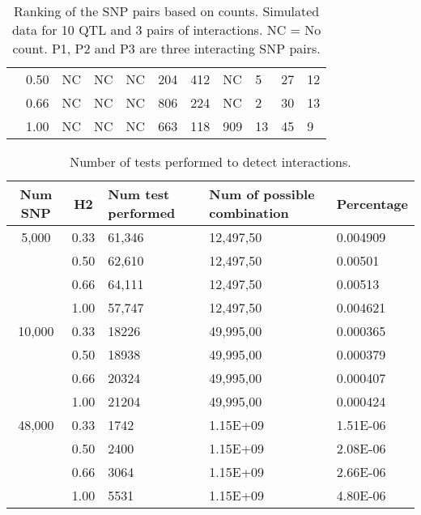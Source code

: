 \documentclass[preprint,12pt,3p]{elsarticle}
\begin{document}
\begin{table}
\begin{center}
\begin{tabular}{|p{0.7cm}|c|p{0.375cm}p{0.375cm}p{0.375cm}|p{0.375cm}p{0.375cm}p{0.375cm}|p{0.375cm}p{0.375cm}p{0.375cm}|}
         & 0.50 & NC & NC & NC & 204  & 412 & NC   & 5   & 27 & 12 \\
         & 0.66 & NC & NC & NC & 806  & 224 & NC   & 2   & 30 & 13 \\
          & 1.00 & NC & NC & NC & 663  & 118 & 909  & 13  & 45 & 9  \\
          \hline
\end{tabular}
\end{center}
\caption{Ranking of the SNP pairs based on counts. Simulated data for 10 QTL and 3 pairs of interactions.
  NC = No count. P1, P2 and P3 are three interacting SNP pairs.}
\label{table:ranking10qtl}
\end{table}


\begin{table}
\begin{center}
	\begin{tabular}{|c|c|p{1.6cm}|p{1.6cm}|p{1.6cm}|}
 \hline
          Num SNP & H2   & Num test performed & Num of possible combination & Percentage  \\
          \hline
5,000             & 0.33 & 61,346             & 12,497,50                   & 0.004909        \\
                  & 0.50 & 62,610             & 12,497,50                   & 0.00501         \\
                  & 0.66 & 64,111             & 12,497,50                   & 0.00513         \\
                  & 1.00 & 57,747             & 12,497,50                   & 0.004621        \\
      \hline
10,000            & 0.33 & 18226              & 49,995,00                   & 0.000365        \\
                  & 0.50 & 18938              & 49,995,00                   & 0.000379        \\
                  & 0.66 & 20324              & 49,995,00                   & 0.000407        \\
                  & 1.00 & 21204              & 49,995,00                   & 0.000424        \\
       \hline
48,000            & 0.33 & 1742               & 1.15E+09                    & 1.51E-06        \\
                  & 0.50 & 2400               & 1.15E+09                    & 2.08E-06        \\
                  & 0.66 & 3064               & 1.15E+09                    & 2.66E-06        \\
                  & 1.00 & 5531               & 1.15E+09                    & 4.80E-06        \\
        \hline
\end{tabular}
\end{center}
\caption{Number of tests performed to detect interactions.}
\label{table:Number.of.tests.performed.to.detect.interactions}
\end{table}
\end{document}
